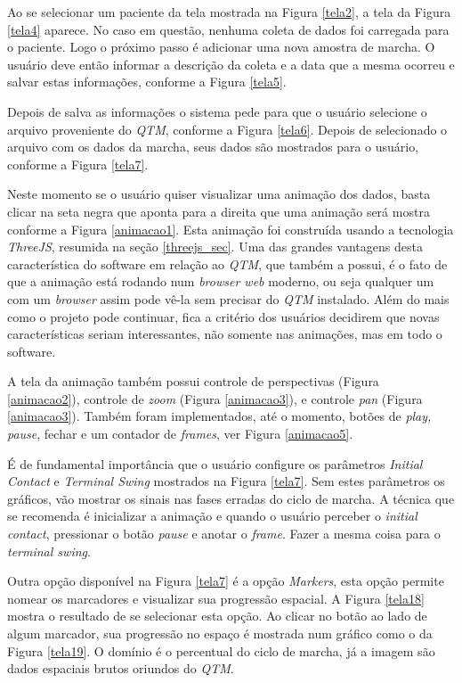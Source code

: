 Ao se selecionar um paciente da tela mostrada na Figura \ref{tela2}, a tela da Figura \ref{tela4} aparece. No caso em questão, nenhuma coleta de dados foi carregada para o paciente. Logo o próximo passo é adicionar uma nova amostra de marcha.
O usuário deve então informar a descrição da coleta e a data que a mesma ocorreu e salvar estas informações, conforme a Figura \ref{tela5}.


Depois de salva as informações o sistema pede para que o usuário selecione o arquivo proveniente do \emph{QTM}, conforme a Figura \ref{tela6}.
Depois de selecionado o arquivo com os dados da marcha, seus dados são mostrados para o usuário, conforme a Figura \ref{tela7}.


Neste momento se o usuário quiser visualizar uma animação dos dados, basta clicar na seta negra que aponta para a direita que uma animação será mostra conforme a Figura \ref{animacao1}.
Esta animação foi construída usando a tecnologia \emph{ThreeJS}, resumida na seção \ref{threejs_sec}. Uma das grandes vantagens desta característica do software em relação ao \emph{QTM}, que também a possui, é o fato de que a animação está rodando num \emph{browser web} moderno, ou seja qualquer um com um \emph{browser} assim pode vê-la sem precisar do \emph{QTM} instalado. 
Além do mais como o projeto pode continuar, fica a critério dos usuários decidirem que novas características seriam interessantes, não somente nas animações, mas em todo o software.

A tela da animação também possui controle de perspectivas 
(Figura \ref{animacao2}), controle de \emph{zoom} (Figura \ref{animacao3}), 
e controle \emph{pan} (Figura \ref{animacao3}).
Também foram implementados, até o momento, botões de \emph{play, pause}, fechar e um contador de \emph{frames}, ver Figura \ref{animacao5}.





É de fundamental importância que o usuário configure os parâmetros \emph{Initial Contact} e \emph{Terminal Swing} mostrados na Figura \ref{tela7}. Sem estes parâmetros os gráficos, vão mostrar os sinais nas fases erradas do ciclo de marcha.
A técnica que se recomenda é inicializar a animação e quando o usuário perceber o \emph{initial contact}, pressionar o botão \emph{pause} e anotar o \emph{frame}. Fazer a mesma coisa para o \emph{terminal swing}.

Outra opção disponível na Figura \ref{tela7} é a opção \emph{Markers}, esta opção permite nomear os marcadores e visualizar sua progressão espacial. 
A Figura \ref{tela18} mostra o resultado de se selecionar esta opção.
Ao clicar no botão ao lado de algum marcador, sua progressão no espaço é mostrada num gráfico como o da Figura \ref{tela19}. O domínio é o percentual do ciclo de marcha, já a imagem são dados espaciais brutos oriundos do \emph{QTM}.

